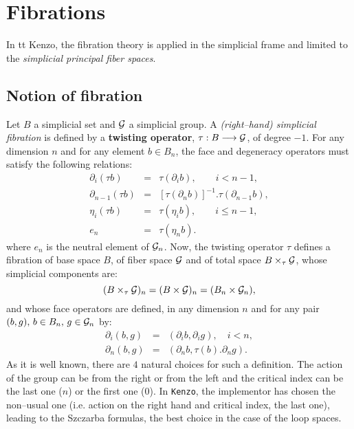 \chapter {Fibrations}

In {tt Kenzo}, the fibration theory is applied in the simplicial frame
and limited to the {\em simplicial principal fiber spaces}.

\section {Notion of fibration}

Let $B$ a simplicial set and $\cal G$ a simplicial group. A {\em (right--hand) simplicial fibration} is
defined by a {\bf twisting operator}, $\tau : B \longrightarrow {\cal G}$,
of degree $-1$.
For any dimension $n$ and for any element $b \in B_n$, the face and degeneracy operators must
satisfy the following relations:
\begin{eqnarray*}
\partial_i(\tau b) & = & \tau(\partial_i b), \qquad i < n-1, \\
\partial_{n-1}(\tau b) & = & [\tau(\partial_n b)]^{-1}.\tau(\partial_{n-1} b), \\
\eta_i(\tau b)  & = & \tau (\eta_i b), \qquad i \leq n-1, \\
e_n             & = & \tau(\eta_n b).
\end{eqnarray*}
where $e_n$ is the neutral element of ${\cal G}_n$.
\vskip 0.30cm
Now, the twisting operator $\tau$ defines a fibration of base space $B$, of fiber space $\cal G$
and of total space $B \times_{\tau} {\cal G}$, whose simplicial components  are:
$$ (B \times_{\tau} {\cal G})_n = (B \times {\cal G})_n = (B_n \times {\cal G}_n), $$
and whose  face operators are defined,
in any dimension $n$ and for any pair $(b,g),\, b \in B_n,\, g \in {\cal G}_n$ by:
\begin{eqnarray*}
\partial_i(b,g) & = & (\partial_i b, \partial_i g), \quad i < n, \\
\partial_n(b,g) & = & (\partial_n b, \tau(b).\partial_n g).
\end{eqnarray*}
As it is well known, there are $4$ natural choices for such a definition. The action of the
group can be from the right or from the left and the critical index can be the last one ($n$) or
the first one ($0$). In {\tt Kenzo}, the implementor has chosen the non--usual one (i.e. action
on the right hand and critical index, the last one), leading to the
Szczarba formulas, the best choice in the case of the loop spaces.

